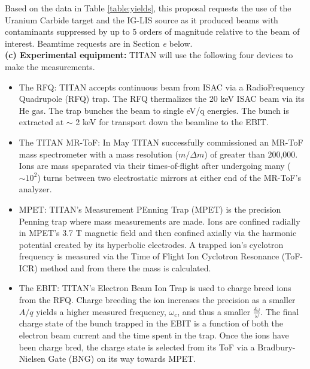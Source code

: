 \documentclass[12pt]{article}
\begin{document}
Based on the data in Table \ref{table:yields}, this proposal requests the use of the Uranium Carbide target and the IG-LIS source as it produced beams with contaminants suppressed by up to 5 orders of magnitude relative to the beam of interest. Beamtime requests are in Section \emph{e} below.\\

\noindent\textbf{(c) Experimental equipment:}
TITAN will use the following four devices to make the measurements.
\begin{itemize}
\item The RFQ: TITAN accepts continuous beam from ISAC via a RadioFrequency Quadrupole (RFQ) trap. The RFQ thermalizes the 20 keV ISAC beam via its He gas. The trap bunches the beam to single eV/q energies. The bunch is extracted at $\sim$ 2 keV for transport down the beamline to the EBIT.

\item The TITAN MR-ToF: In May TITAN successfully commissioned an MR-ToF mass spectrometer with a mass resolution ($m/\Delta m$) of greater than 200,000. Ions are mass speparated via their times-of-flight after undergoing many ($\sim 10^2$) turns between two electrostatic mirrors at either end of the MR-ToF's analyzer.

\item MPET: TITAN's Measurement PEnning Trap (MPET) is the precision Penning trap where mass measurements are made. Ions are confined radially in MPET's 3.7 T magnetic field and then confined axially via the harmonic potential created by its hyperbolic electrodes. A trapped ion's cyclotron frequency is measured via the Time of Flight Ion Cyclotron Resonance (ToF-ICR) method and from there the mass is calculated.

\item The EBIT: TITAN's Electron Beam Ion Trap is used to charge breed ions from the RFQ. Charge breeding the ion increases the precision as a smaller $A/q$ yields a higher measured frequency, $\omega_c$, and thus a smaller $\frac{\delta \omega}{\omega}$. The final charge state of the bunch trapped in the EBIT is a function of both the electron beam current and the time spent in the trap. Once the ions have been charge bred, the charge state is selected from its ToF via a Bradbury-Nielsen Gate (BNG) on its way towards MPET.


\end{itemize}
\end{document}
